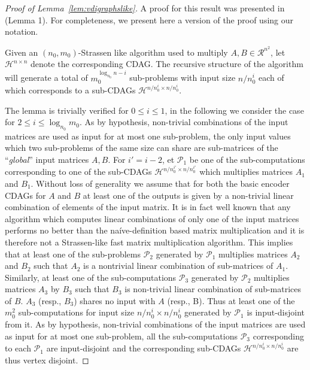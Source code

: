 \documentclass[a4paper,UKenglish]{lipics-v2016}
\newcommand{\ri}{\mathcal{R}}
\newcommand{\stral}[1]{\mathcal{H}^{#1}}
\begin{document}
\begin{proof}[Proof of Lemma~\ref{lem:vdigraphslike}]
A proof for this result was presented in~\cite{scott2015matrix} (Lemma 1). For completeness, we present here a version of the proof using our notation.

Given an $\left(n_0, m_0\right)$-Strassen like algorithm used to multiply $A,B\in\ri^{n^2}$, let $\stral{n\times n}$ denote the corresponding CDAG. The recursive structure of the algorithm will generate a total of $m_0^{\log_{n_0}n-i} $ sub-problems with input size $n/n_0^i$ each of which corresponds to a sub-CDAGs $\stral{n/n_0^i\times n/n_0^i}$.

The lemma is trivially verified for $0\leq i \leq 1$, in the following we consider the case for $2\leq i\leq \log_{n_0} m_0$. As by hypothesis, non-trivial combinations of the input matrices are used as input for at most one sub-problem, the only input values which two sub-problems of the same size  can  share are sub-matrices of the ``\emph{global}'' input matrices $A,B$. For $i'=i-2$, et $\mathcal{P}_{1}$ be one of the sub-computations corresponding to one of the sub-CDAGs $\stral{n/n_0^{i'}\times n/n_0^{i'}}$ which multiplies matrices $A_1$ and $B_1$. 
Without loss of generality we assume that for both the basic encoder CDAGs for $A$ and $B$ at least one of the outputs is given by a non-trivial linear combination of elements of the input matrix. It is in fact well known that any algorithm which computes linear combinations of only one of the input matrices performs no better than the na\'ive-definition based matrix multiplication and it is therefore not a Strassen-like fast matrix multiplication algorithm.
This implies that at least one of the sub-problems $\mathcal{P}_{2}$ generated by $\mathcal{P}_{1}$ multiplies matrices $A_2$ and $B_2$ such that $A_2$ is a nontrivial linear combination of sub-matrices of $A_1$. Similarly, at least one of the  sub-computations $\mathcal{P}_{3}$ generated by $\mathcal{P}_{2}$ multiplies matrices $A_3$ by $B_3$ such that $B_3$ is  non-trivial linear combination of sub-matrices of $B$. $A_3$ (resp., $B_3$) shares no input with $A$ (resp., B). Thus at least one of the $m_0^2$ sub-computations for input size $n/n_0^i \times n/n_0^i$  generated by $\mathcal{P}_{1}$ is input-disjoint from it. 
As by hypothesis, non-trivial combinations of the input matrices are used as input for at most one sub-problem, all the sub-computations $\mathcal{P}_{3}$ corresponding to each $\mathcal{P}_{1}$ are input-disjoint and the corresponding sub-CDAGs $\stral{n/n_0^i\times n/n_0^i}$ are thus vertex disjoint.
\end{proof}
\end{document}
